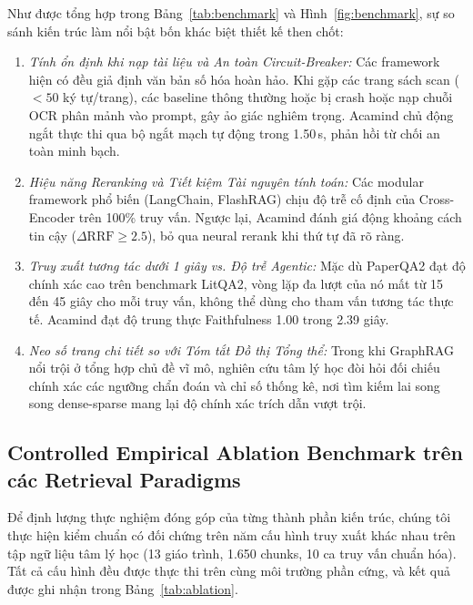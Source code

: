 \documentclass[10pt]{SPIIRAS_Proceedings}
\begin{document}
Như được tổng hợp trong Bảng~\ref{tab:benchmark} và Hình~\ref{fig:benchmark}, sự so sánh kiến trúc làm nổi bật bốn khác biệt thiết kế then chốt:
\begin{enumerate}
    \item \textit{Tính ổn định khi nạp tài liệu và An toàn Circuit-Breaker:} Các framework hiện có đều giả định văn bản số hóa hoàn hảo. Khi gặp các trang sách scan ($<50$ ký tự/trang), các baseline thông thường hoặc bị crash hoặc nạp chuỗi OCR phân mảnh vào prompt, gây ảo giác nghiêm trọng. Acamind chủ động ngắt thực thi qua bộ ngắt mạch tự động trong 1.50\,s, phản hồi từ chối an toàn minh bạch.
    \item \textit{Hiệu năng Reranking và Tiết kiệm Tài nguyên tính toán:} Các modular framework phổ biến (LangChain, FlashRAG) chịu độ trễ cố định của Cross-Encoder trên 100\% truy vấn. Ngược lại, Acamind đánh giá động khoảng cách tin cậy ($\Delta \text{RRF} \ge 2.5$), bỏ qua neural rerank khi thứ tự đã rõ ràng.
    \item \textit{Truy xuất tương tác dưới 1 giây vs. Độ trễ Agentic:} Mặc dù PaperQA2 \cite{skarlinski2024paperqa} đạt độ chính xác cao trên benchmark LitQA2, vòng lặp đa lượt của nó mất từ 15 đến 45 giây cho mỗi truy vấn, không thể dùng cho tham vấn tương tác thực tế. Acamind đạt độ trung thực Faithfulness 1.00 trong 2.39 giây.
    \item \textit{Neo số trang chi tiết so với Tóm tắt Đồ thị Tổng thể:} Trong khi GraphRAG \cite{edge2024graphrag} nổi trội ở tổng hợp chủ đề vĩ mô, nghiên cứu tâm lý học đòi hỏi đối chiếu chính xác các ngưỡng chẩn đoán và chỉ số thống kê, nơi tìm kiếm lai song song dense-sparse mang lại độ chính xác trích dẫn vượt trội.
\end{enumerate}

\subsection{Controlled Empirical Ablation Benchmark trên các Retrieval Paradigms}\label{sec:ablation}
Để định lượng thực nghiệm đóng góp của từng thành phần kiến trúc, chúng tôi thực hiện kiểm chuẩn có đối chứng trên năm cấu hình truy xuất khác nhau trên tập ngữ liệu tâm lý học (13 giáo trình, 1.650 chunks, 10 ca truy vấn chuẩn hóa). Tất cả cấu hình đều được thực thi trên cùng môi trường phần cứng, và kết quả được ghi nhận trong Bảng~\ref{tab:ablation}.
\end{document}

